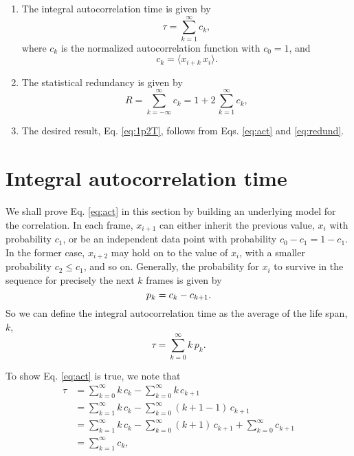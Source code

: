 \documentclass[12pt]{article}
\begin{document}
\begin{enumerate}
\item
The integral autocorrelation time is given by
%
\begin{equation}
  \tau
  =
  \sum_{k = 1}^\infty c_k
  ,
  \label{eq:act}
\end{equation}
%
where $c_k$
is the normalized autocorrelation function with $c_0 = 1$, and
\begin{equation}
  c_k = \langle x_{i + k} \, x_i \rangle
  .
  \label{eq:ck_def}
\end{equation}

\item
The statistical redundancy is given by
%
\begin{equation}
  R
  = \sum_{k = -\infty}^\infty c_k
  = 1 + 2 \, \sum_{k = 1}^\infty c_k
  ,
  \label{eq:redund}
\end{equation}
%

\item
The desired result, Eq. \eqref{eq:1p2T},
follows from Eqs. \eqref{eq:act} and \eqref{eq:redund}.

\end{enumerate}


\section{Integral autocorrelation time}


We shall prove Eq. \eqref{eq:act} in this section
by building an underlying model for the correlation.
%
In each frame,
$x_{ i + 1 }$
can either inherit the previous value, $x_i$
with probability $c_1$,
or be an independent data point
with probability $c_0 - c_1 = 1 - c_1$.
%
In the former case,
$x_{i + 2}$ may hold on to the value of $x_i$,
with a smaller probability $c_2 \le c_1$,
and so on.
%
Generally,
the probability for $x_i$ to survive in the sequence for precisely
the next $k$ frames is given by
%
\begin{equation}
  p_k = c_k - c_{k + 1}
  .
  \notag
\end{equation}
%
So we can define the integral autocorrelation time as
the average of the life span, $k$,
%
$$
  \tau = \sum_{k = 0}^\infty k \, p_k.
$$

To show Eq. \eqref{eq:act} is true, we note that
$$
\begin{aligned}
\tau
&=
\sum_{ k = 0 }^\infty k \, c_k
- \sum_{ k = 0 }^\infty k \, c_{k + 1}
\\
&=
\sum_{ k = 1 }^\infty k \, c_k
- \sum_{ k = 0 }^\infty (k + 1 - 1) \, c_{k + 1}
\\
&=
\sum_{ k = 1 }^\infty k \, c_k
-
\sum_{ k = 0 }^\infty (k + 1) \, c_{ k + 1 }
+
\sum_{ k = 0 }^\infty c_{k + 1}
\\
&=
\sum_{ k = 1 }^\infty c_k,
\end{aligned}
$$
\end{document}
